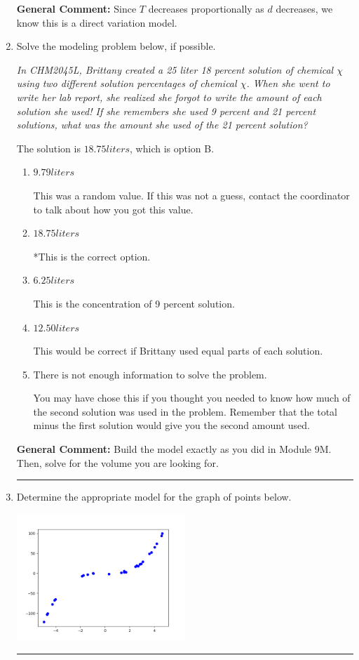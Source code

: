 \documentclass{extbook}[14pt]
\newcommand{\litem}[1]{\item #1

\rule{\textwidth}{0.4pt}}
\begin{document}
\begin{enumerate}
{\textbf{General Comment:} Since $T$ decreases proportionally as $d$ decreases, we know this is a direct variation model.
}
\litem{
Solve the modeling problem below, if possible.

\begin{center}
    \textit{ In CHM2045L, Brittany created a 25 liter 18 percent solution of chemical $\chi$ using two different solution percentages of chemical $\chi$. When she went to write her lab report, she realized she forgot to write the amount of each solution she used! If she remembers she used 9 percent and 21 percent solutions, what was the amount she used of the 21 percent solution? }
\end{center}
The solution is \( 18.75 liters \), which is option B.\begin{enumerate}[label=\Alph*.]
\item \( 9.79 liters \)

This was a random value. If this was not a guess, contact the coordinator to talk about how you got this value.
\item \( 18.75 liters \)

*This is the correct option.
\item \( 6.25 liters \)

This is the concentration of 9 percent solution.
\item \( 12.50 liters \)

This would be correct if Brittany used equal parts of each solution.
\item \( \text{There is not enough information to solve the problem.} \)

You may have chose this if you thought you needed to know how much of the second solution was used in the problem. Remember that the total minus the first solution would give you the second amount used.
\end{enumerate}

\textbf{General Comment:} Build the model exactly as you did in Module 9M. Then, solve for the volume you are looking for.
}
\litem{
Determine the appropriate model for the graph of points below.

\begin{center}
    \includegraphics[width=0.5\textwidth]{../Figures/identifyModelGraph12CopyB.png}
\end{center}


}
\end{enumerate}
\end{document}
